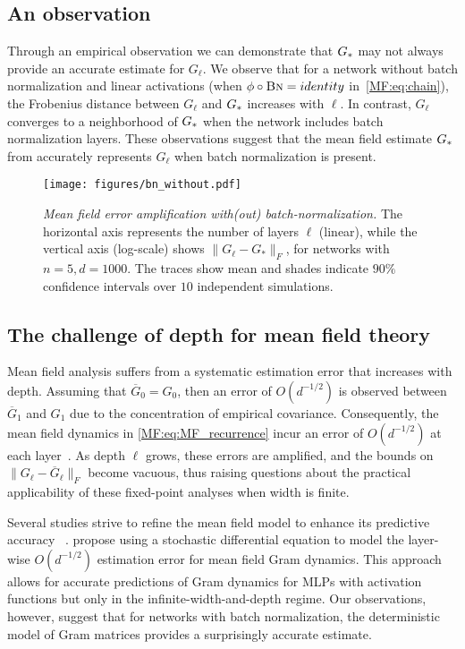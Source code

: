 \subsection{An observation}
Through an empirical observation we can demonstrate that ${G_*}$ may not always provide an accurate estimate for $G_\ell$. We observe that for a network without batch normalization and linear activations (when $\phi\circ\text{\sc{Bn}}=identity$ in~\eqref{MF:eq:chain}), the Frobenius distance between $G_\ell$ and ${G_*}$ increases with $\ell$. In contrast, $G_\ell$ converges to a neighborhood of ${G_*}$ when the network includes batch normalization layers. These observations suggest that the mean field estimate ${G_*}$ from \citet{yang2018a} accurately represents $G_\ell$ when batch normalization is present.
  

 
\begin{figure}
    \centering
    \texttt{[image: figures/bn\_without.pdf]}
    \vspace{-.5cm}
    \caption{\textit{Mean field error amplification with(out) batch-normalization.} The horizontal axis represents the number of layers $\ell$ (linear), while the vertical axis (log-scale) shows $\|G_\ell- G_*\|_F$, for networks with $n=5, d=1000$. The traces show mean and shades indicate $90\%$ confidence intervals over $10$ independent simulations. }
    \label{MF:fig:rapidly_mixing}
\end{figure}



\subsection{The challenge of depth for mean field theory}
Mean field analysis suffers from a systematic estimation error that increases with depth. Assuming that $\overline{G}_0= G_0$, then an error of $O(d^{-1/2})$ is observed between $\overline{G}_1$ and $G_1$ due to the concentration of empirical covariance. Consequently, the mean field dynamics in \eqref{MF:eq:MF_recurrence} incur an error of $O(d^{-1/2})$ at each layer~\cite{li2022neural}. As depth $\ell$ grows, these errors are amplified, and the bounds on $\| G_\ell - \overline{G}_\ell\|_F $ become vacuous, thus raising questions about the practical applicability of these fixed-point analyses when width is finite. 

Several studies strive to refine the mean field model to enhance its predictive accuracy ~\cite{matthews2018gaussian,hanin2019finite,li2022neural}. \citet{li2022neural} propose using a stochastic differential equation to model the layer-wise $O(d^{-1/2})$ estimation error for mean field Gram dynamics. This approach allows for accurate predictions of Gram dynamics for MLPs with activation functions but only in the infinite-width-and-depth regime. Our observations, however, suggest that for networks with batch normalization, the deterministic model of Gram matrices provides a surprisingly accurate estimate.

